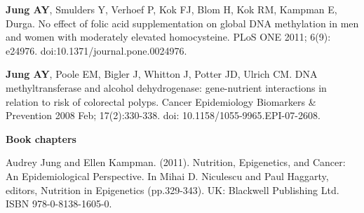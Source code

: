 \noindent \textbf{Jung AY}, Smulders Y, Verhoef P, Kok FJ, Blom H, Kok RM, Kampman E, Durga. No effect of folic acid supplementation on global DNA methylation in men and women with moderately elevated homocysteine. PLoS ONE 2011; 6(9): e24976. doi:10.1371/journal.pone.0024976.

\noindent \textbf{Jung AY}, Poole EM, Bigler J, Whitton J, Potter JD, Ulrich CM. DNA methyltransferase and alcohol dehydrogenase: gene-nutrient interactions in relation to risk of colorectal polyps. Cancer Epidemiology Biomarkers \& Prevention 2008 Feb; 17(2):330-338. doi: 10.1158/1055-9965.EPI-07-2608.

\noindent \textbf{Book chapters}

\noindent Audrey Jung and Ellen Kampman. (2011). Nutrition, Epigenetics, and Cancer: An Epidemiological Perspective. In Mihai D. Niculescu and Paul Haggarty, editors, Nutrition in Epigenetics (pp.329-343). UK: Blackwell Publishing Ltd. ISBN 978-0-8138-1605-0.
